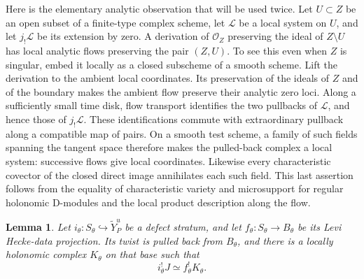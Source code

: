 \documentclass[11pt]{article}
\numberwithin{equation}{section}
\newtheorem{lemma}[theorem]{Lemma}
\theoremstyle{definition}
\theoremstyle{remark}
\begin{document}
Here is the elementary analytic observation that will be used twice.  Let
$U\subset Z$ be an open subset of a finite-type complex scheme, let
$\mathcal L$ be a local system on $U$, and let $j_!\mathcal L$ be its extension
by zero.  A derivation of $\mathcal O_Z$ preserving the ideal of $Z\setminus U$
has local analytic flows preserving the pair $(Z,U)$.  To see this even when
$Z$ is singular, embed it locally as a closed subscheme of a smooth scheme.
Lift the derivation to the ambient local coordinates.  Its preservation of
the ideals of $Z$ and of the boundary makes the ambient flow preserve their
analytic zero loci.  Along a sufficiently small time disk, flow transport
identifies the two pullbacks of $\mathcal L$, and hence those of
$j_!\mathcal L$.  These identifications commute with extraordinary pullback
along a compatible map of pairs.  On a smooth test scheme, a family of such
fields spanning the tangent space therefore makes the pulled-back complex
a local system: successive flows give local coordinates.  Likewise every
characteristic covector of the closed direct image annihilates each such
field.  This last assertion follows from the equality of characteristic
variety and microsupport for regular holonomic D-modules
\cite[Theorem~11.3.3]{KashiwaraSchapira} and the local product description
along the flow.

\begin{lemma}\label{pseudo:fiber-descent}
Let $i_\theta:S_\theta\hookrightarrow\widetilde Y_P^u$ be a defect stratum,
and let $f_\theta:S_\theta\to B_\theta$ be its Levi Hecke-data projection.
Its twist is pulled back from $B_\theta$, and there is a locally holonomic
complex $K_\theta$ on that base such that
\begin{equation}\label{eq:M2}
 i_\theta^!J\simeq f_\theta^!K_\theta.
\end{equation}
\end{lemma}
\end{document}
